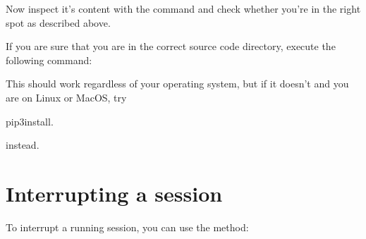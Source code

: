 \documentclass[letterpaper,10pt,english]{sphinxmanual}
\begin{document}
\sphinxAtStartPar
Now inspect it’s content with the command  and check whether you’re in the
right spot as described above.

\sphinxAtStartPar
If you are sure that you are in the correct source code directory, execute the
following command:

\begin{sphinxVerbatim}[commandchars=\\\{\}]
  
\end{sphinxVerbatim}

\sphinxAtStartPar
This should work regardless of your operating system, but if it doesn’t and you
are on Linux or MacOS, try

\begin{sphinxVerbatim}[commandchars=\\\{\}]
pip3install.
\end{sphinxVerbatim}

\sphinxAtStartPar
instead.


\section{Interrupting a session}
\label{\detokenize{usage:interrupting-a-session}}
\sphinxAtStartPar
To interrupt a running session, you can use the 
method:
\end{document}
